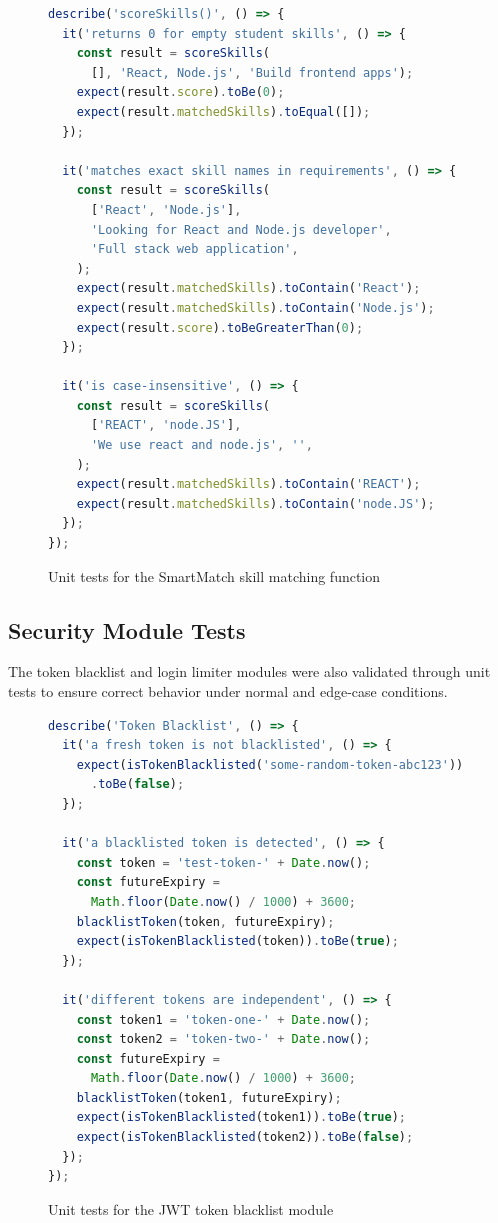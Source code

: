 \begin{figure}[H]
\begin{lstlisting}[language=JavaScript]
describe('scoreSkills()', () => {
  it('returns 0 for empty student skills', () => {
    const result = scoreSkills(
      [], 'React, Node.js', 'Build frontend apps');
    expect(result.score).toBe(0);
    expect(result.matchedSkills).toEqual([]);
  });

  it('matches exact skill names in requirements', () => {
    const result = scoreSkills(
      ['React', 'Node.js'],
      'Looking for React and Node.js developer',
      'Full stack web application',
    );
    expect(result.matchedSkills).toContain('React');
    expect(result.matchedSkills).toContain('Node.js');
    expect(result.score).toBeGreaterThan(0);
  });

  it('is case-insensitive', () => {
    const result = scoreSkills(
      ['REACT', 'node.JS'],
      'We use react and node.js', '',
    );
    expect(result.matchedSkills).toContain('REACT');
    expect(result.matchedSkills).toContain('node.JS');
  });
});
\end{lstlisting}
\caption{Unit tests for the SmartMatch skill matching function}
\label{fig:code-test-skills}
\end{figure}

\subsection{Security Module Tests}

The token blacklist and login limiter modules were also validated through unit tests to ensure correct behavior under normal and edge-case conditions.

\begin{figure}[H]
\begin{lstlisting}[language=JavaScript]
describe('Token Blacklist', () => {
  it('a fresh token is not blacklisted', () => {
    expect(isTokenBlacklisted('some-random-token-abc123'))
      .toBe(false);
  });

  it('a blacklisted token is detected', () => {
    const token = 'test-token-' + Date.now();
    const futureExpiry =
      Math.floor(Date.now() / 1000) + 3600;
    blacklistToken(token, futureExpiry);
    expect(isTokenBlacklisted(token)).toBe(true);
  });

  it('different tokens are independent', () => {
    const token1 = 'token-one-' + Date.now();
    const token2 = 'token-two-' + Date.now();
    const futureExpiry =
      Math.floor(Date.now() / 1000) + 3600;
    blacklistToken(token1, futureExpiry);
    expect(isTokenBlacklisted(token1)).toBe(true);
    expect(isTokenBlacklisted(token2)).toBe(false);
  });
});
\end{lstlisting}
\caption{Unit tests for the JWT token blacklist module}
\label{fig:code-test-blacklist}
\end{figure}

